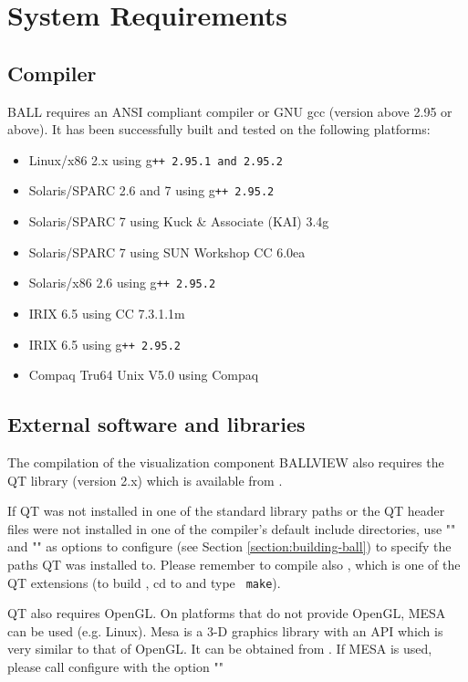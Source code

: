 \section{System Requirements}

\subsection{Compiler}
  BALL requires an ANSI compliant \CPP compiler or GNU gcc
  (version above 2.95 or above).
  It has been successfully built and tested on the following platforms:
	\begin{itemize}	
   	\item Linux/x86 2.x using g\tt{++} 2.95.1 and 2.95.2
   	\item Solaris/SPARC 2.6 and 7 using g\tt{++} 2.95.2
   	\item Solaris/SPARC 7 using Kuck \& Associate (KAI) \CPP 3.4g
   	\item Solaris/SPARC 7 using SUN Workshop CC 6.0ea
   	\item Solaris/x86 2.6 using g\tt{++} 2.95.2
   	\item IRIX 6.5 using CC 7.3.1.1m
   	\item IRIX 6.5 using g\tt{++} 2.95.2
   	\item Compaq Tru64 Unix V5.0 using Compaq 
 	\end{itemize}

\subsection{External software and libraries}
The compilation of the visualization component BALLVIEW also requires
the QT library (version 2.x) which is available from
.

If QT was not installed in one of the standard library paths or the
QT header files were not installed in one of the compiler's default
include directories, use "" and
"" as
options to configure (see Section \ref{section:building-ball}) to specify the paths
QT was installed to.
Please remember to compile also , which is one of the QT extensions
(to build , cd to {\tt{}} and type {\tt
make}).

QT also requires OpenGL. On platforms that do not provide OpenGL, MESA can
be used (e.g. Linux). Mesa is a 3-D graphics library with an API which is 
very similar to that of OpenGL. It can be obtained from .
If MESA is used, please call configure with the option ""

